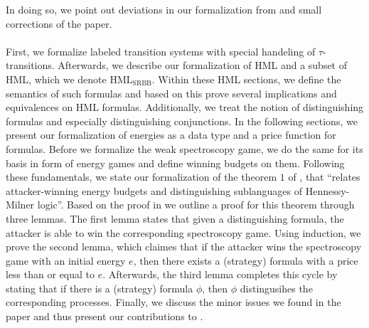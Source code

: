 In doing so, we point out deviations in our formalization from and small corrections of the paper.
\\\\
First, we formalize labeled transition systems with special handeling of $\tau$-transitions.
Afterwards, we describe our formalization of HML and a subset of HML, which we denote HML$_\text{SRBB}$.
Within these HML sections, we define the semantics of such formulas and based on this prove several implications and equivalences on HML formulas.
Additionally, we treat the notion of distinguishing formulas and especially distinguishing conjunctions.
In the following sections, we present our formalization of energies as a data type and a price function for formulas.
Before we formalize the weak spectroscopy game, we do the same for its basis in form of energy games and define winning budgets on them.
Following these fundamentals, we state our formalization of the theorem $1$ of \cite{bisping2023lineartimebranchingtime}, that ``relates attacker-winning energy budgets and distinguishing sublanguages of Hennessy-Milner logic''. 
Based on the proof in \cite{bisping2023lineartimebranchingtime} we outline a proof for this theorem through three lemmas. 
The first lemma states that given a distinguishing formula, the attacker is able to win the corresponding spectroscopy game.
Using induction, we prove the second lemma, which claimes that if the attacker wins the spectroscopy game with an initial energy $e$, then there exists a (strategy) formula with a price less than or equal to $e$.
Afterwards, the third lemma completes this cycle by stating that if there is a (strategy) formula $\phi$, then $\phi$ distingusihes the corresponding processes.
Finally, we discuss the minor issues we found in the paper and thus present our contributions to \cite{bisping2023lineartimebranchingtime}.